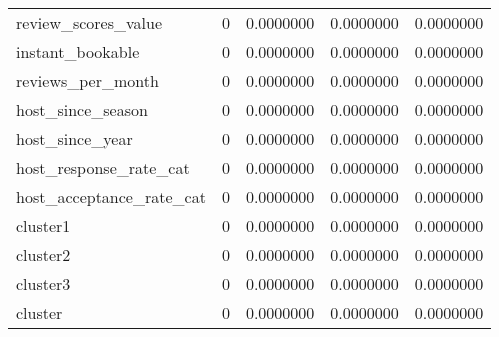 \begin{tabular}[t]{lrrrr}
review\_scores\_value & 0 & 0.0000000 & 0.0000000 & 0.0000000\\
\addlinespace
instant\_bookable & 0 & 0.0000000 & 0.0000000 & 0.0000000\\
reviews\_per\_month & 0 & 0.0000000 & 0.0000000 & 0.0000000\\
host\_since\_season & 0 & 0.0000000 & 0.0000000 & 0.0000000\\
host\_since\_year & 0 & 0.0000000 & 0.0000000 & 0.0000000\\
host\_response\_rate\_cat & 0 & 0.0000000 & 0.0000000 & 0.0000000\\
\addlinespace
host\_acceptance\_rate\_cat & 0 & 0.0000000 & 0.0000000 & 0.0000000\\
cluster1 & 0 & 0.0000000 & 0.0000000 & 0.0000000\\
cluster2 & 0 & 0.0000000 & 0.0000000 & 0.0000000\\
cluster3 & 0 & 0.0000000 & 0.0000000 & 0.0000000\\
cluster & 0 & 0.0000000 & 0.0000000 & 0.0000000\\
\bottomrule
\end{tabular}
